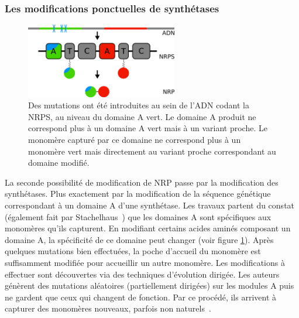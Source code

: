 \subsubsection{Les modifications ponctuelles de synthétases}

\begin{figure}[h!]
  \begin{center}
    \includegraphics[width=250px]{Figures/synthese/mutations.png}
    \caption{\label{mutation}Des mutations ont été introduites au sein de l'ADN codant la NRPS, au niveau du domaine A vert.
    Le domaine A produit ne correspond plus à un domaine A vert mais à un variant proche.
    Le monomère capturé par ce domaine ne correspond plus à un monomère vert mais directement au variant proche correspondant au domaine modifié.}
  \end{center}
\end{figure}

La seconde possibilité de modification de NRP passe par la modification des synthétases.
Plus exactement par la modification de la séquence génétique correspondant à un domaine A d'une synthétase.
Les travaux \cite{villiers_mapping_2009, kries_reprogramming_2014, williams_engineering_2013} partent du constat (également fait par Stachelhaus~\cite{stachelhaus_specificity-conferring_1999}) que les domaines A sont spécifiques aux monomères qu'ils capturent.
En modifiant certains acides aminés composant un domaine A, la spécificité de ce domaine peut changer (voir figure \ref{mutation}).
Après quelques mutations bien effectuées, la poche d'accueil du monomère est suffisamment modifiée pour accueillir un autre monomère.
Les modifications à effectuer sont découvertes via des techniques d'évolution dirigée.
Les auteurs génèrent des mutations aléatoires (partiellement dirigées) sur les modules A puis ne gardent que ceux qui changent de fonction.
Par ce procédé, ils arrivent à capturer des monomères nouveaux, parfois non naturels~\cite{thirlway_introduction_2012}.



